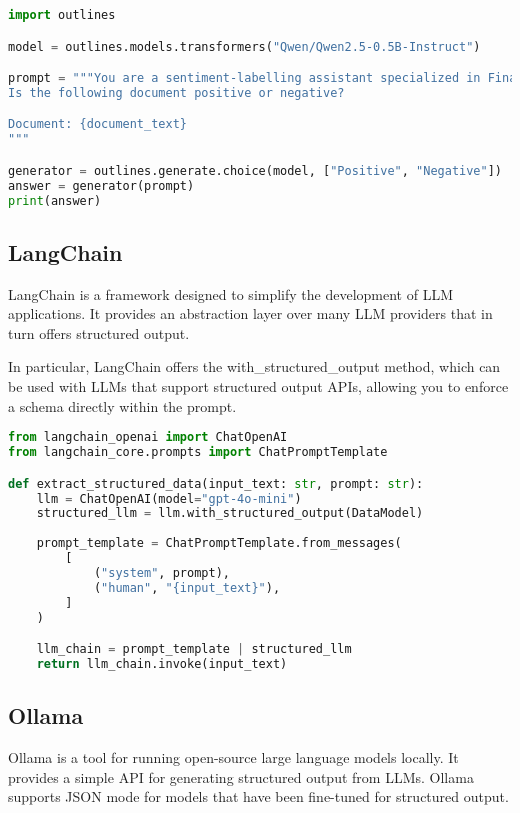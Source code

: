 \documentclass{article}
\begin{document}
\begin{lstlisting}[language=Python, caption=Using Outlines for multiple choice generation]
import outlines

model = outlines.models.transformers("Qwen/Qwen2.5-0.5B-Instruct")

prompt = """You are a sentiment-labelling assistant specialized in Financial Statements.
Is the following document positive or negative?

Document: {document_text}
"""

generator = outlines.generate.choice(model, ["Positive", "Negative"])
answer = generator(prompt)
print(answer)
\end{lstlisting}

\subsection{LangChain}

LangChain is a framework designed to simplify the development of LLM applications. It provides an abstraction layer over many LLM providers that in turn offers structured output.

In particular, LangChain offers the with\_structured\_output method, which can be used with LLMs that support structured output APIs, allowing you to enforce a schema directly within the prompt.

\begin{lstlisting}[language=Python, caption=Using LangChain for structured output]
from langchain_openai import ChatOpenAI
from langchain_core.prompts import ChatPromptTemplate

def extract_structured_data(input_text: str, prompt: str):
    llm = ChatOpenAI(model="gpt-4o-mini")
    structured_llm = llm.with_structured_output(DataModel)
    
    prompt_template = ChatPromptTemplate.from_messages(
        [
            ("system", prompt),
            ("human", "{input_text}"),
        ]
    )

    llm_chain = prompt_template | structured_llm
    return llm_chain.invoke(input_text)
\end{lstlisting}

\subsection{Ollama}

Ollama is a tool for running open-source large language models locally. It provides a simple API for generating structured output from LLMs. Ollama supports JSON mode for models that have been fine-tuned for structured output.
\end{document}
